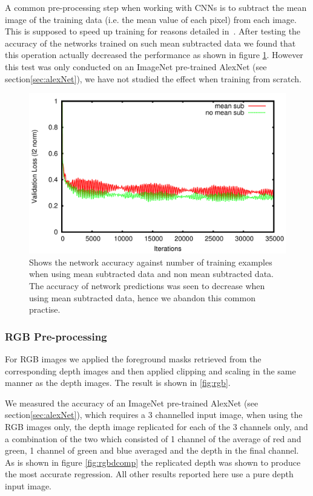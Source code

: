 \documentclass[11pt]{article} %
\begin{document}
A common pre-processing step when working with CNNs is to subtract the mean image of the training data (i.e. the mean value of each pixel) from each image. This is supposed to speed up training for reasons detailed in~\cite{LeCun1998a,Bottou2010,LeCun2012}. After testing the accuracy of the networks trained on such mean subtracted data we found that this operation actually decreased the performance as shown in figure \ref{fig:meanSubComp}. However this test was only conducted on an ImageNet pre-trained AlexNet (see section\ref{sec:alexNet}), we have not studied the effect when training from scratch.

\begin{figure}
\centering
\includegraphics*[width=0.8\linewidth,clip]{meanSub.pdf} %
\caption{Shows the network accuracy against number of training examples when using mean subtracted data and non mean subtracted data. The accuracy of network predictions was seen to decrease when using mean subtracted data, hence we abandon this common practise.}
\label{fig:meanSubComp}
\end{figure}


\subsubsection{RGB Pre-processing}

For RGB images we applied the foreground masks retrieved from the corresponding depth images and then applied clipping and scaling in the same manner as the depth images. The result is shown in \ref{fig:rgb}. 

We measured the accuracy of an ImageNet pre-trained AlexNet (see section\ref{sec:alexNet}), which requires a 3 channelled input image, when using the RGB images only, the depth image replicated for each of the 3 channels only, and a combination of the two which consisted of 1 channel of the average of red and green, 1 channel of green and blue averaged and the depth in the final channel. As is shown in figure \ref{fig:rgbdcomp} the replicated depth was shown to produce the most accurate regression. All other results reported here use a pure depth input image. 
\end{document}
